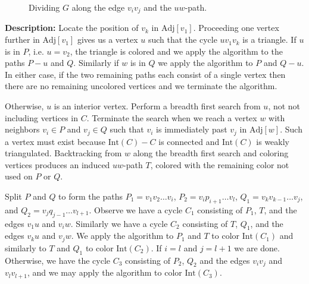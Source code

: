 \documentclass[letterpaper, 12pt]{article}
\theoremstyle{definition}
\theoremstyle{definition}
\theoremstyle{thm}
\theoremstyle{definition}
\begin{document}
\begin{figure}
\begin{center}
\caption{Dividing $G$ along the edge $v_iv_j$ and the $uw$-path.}
\end{center}
\end{figure}

\noindent\textbf{Description:} Locate the position of $v_k$ in $\text{Adj}[v_1]$.
Proceeding one vertex further
in $\text{Adj}[v_1]$ gives us a vertex $u$ such that the cycle $uv_1v_k$ is a triangle. If
$u$ is in $P$, i.e. $u=v_2$, the triangle is colored and we apply the algorithm
to the paths $P-u$ and $Q$. Similarly if $w$ is in $Q$ we apply the algorithm
to $P$ and $Q-u$. In either case, if the two remaining paths each consist of a
single vertex then there are no remaining uncolored vertices and we terminate
the algorithm.

Otherwise, $u$ is an interior vertex. Perform a breadth first search from $u$,
not not including vertices in $C$. Terminate the search when we reach a vertex
$w$ with neighbors $v_i\in P$ and $v_j \in Q$ such that $v_i$ is immediately
past $v_j$ in $\text{Adj}[w]$. Such a vertex must exist because
$\text{Int}(C)-C$ is connected and $\text{Int}(C)$ is weakly triangulated.
Backtracking from $w$ along the breadth first search and coloring vertices
produces an induced $uw$-path $T$, colored with the remaining color not used on
$P$ or $Q$.

Split $P$ and $Q$ to form the paths $P_1=v_1v_2\ldots v_i$, $P_2=v_ip_{i+1}\ldots v_l$,
$Q_1=v_kv_{k-1}\ldots v_j$, and $Q_2=v_jq_{j-1}\ldots v_{l+1}$. Observe we
have a cycle $C_1$ consisting of $P_1$, $T$, and the edges $v_1u$ and $v_iw$.
Similarly we have a cycle $C_2$ consisting of $T$, $Q_1$, and the edges $v_ku$
and $v_jw$. We apply the algorithm to $P_1$ and $T$ to color $\text{Int}(C_1)$
and similarly to $T$ and $Q_1$ to color $\text{Int}(C_2)$. If $i=l$ and
$j=l+1$ we are done. Otherwise, we have the cycle $C_3$ consisting of $P_2$,
$Q_2$ and the edges $v_iv_j$ and $v_lv_{l+1}$, and we may apply the algorithm to
color $\text{Int}(C_3)$.
\end{document}
